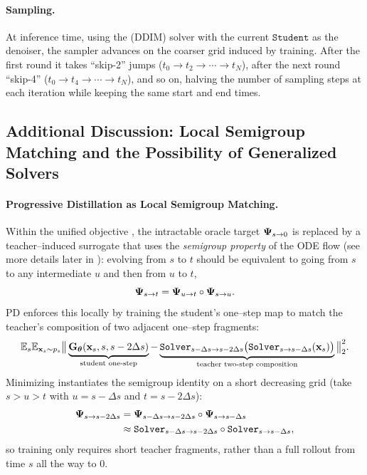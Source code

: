 \paragraph{Sampling.}
At inference time, using the (DDIM) solver with the current $\mathtt{Student}$ as the denoiser, the sampler advances on the coarser grid induced by training. After the first round it takes ``skip-2'' jumps ($t_0 \to t_2 \to \cdots \to t_N$), after the next round ``skip-4'' ($t_0 \to t_4 \to \cdots \to t_N$), and so on, halving the number of sampling steps at each iteration while keeping the same start and end times.

\subsection{Additional Discussion: Local Semigroup Matching and the Possibility of Generalized Solvers}


\paragraph{Progressive Distillation as Local Semigroup Matching.}
Within the unified objective , the intractable oracle
target ${\bm{\Psi}}_{s\to 0}$ is replaced by a teacher–induced surrogate that uses the
\emph{semigroup property} of the ODE flow (see more details later in ): evolving from $s$ to $t$ should be
equivalent to going from $s$ to any intermediate $u$ and then from $u$ to $t$,
\[
{\bm{\Psi}}_{s\to t} = {\bm{\Psi}}_{u\to t}\circ{\bm{\Psi}}_{s\to u}.
\]
PD enforces this locally by training the student’s one–step map to match the
teacher’s composition of two adjacent one–step fragments:
\begin{align}\label{eq:pd-local}
  \mathbb{E}_{s}\mathbb{E}_{{\mathbf{x}}_s\sim p_s}
  \big\|
    \underbrace{{\mathbf{G}}_{{\bm{\theta}}}({\mathbf{x}}_s, s, s-2\Delta s)}_{\text{student one-step}}
    -
    \underbrace{\mathtt{Solver}_{s-\Delta s\to s-2\Delta s}\big(\mathtt{Solver}_{s\to s-\Delta s}({\mathbf{x}}_s)\big)}_{\text{teacher two-step composition}}
  \big\|_2^2.
\end{align}
Minimizing  instantiates the semigroup identity on a short
decreasing grid (take $s>u>t$ with $u=s-\Delta s$ and $t=s-2\Delta s$):
\begin{align*}
  {\bm{\Psi}}_{s\to s-2\Delta s}
  &= {\bm{\Psi}}_{s-\Delta s\to s-2\Delta s}\circ{\bm{\Psi}}_{s\to s-\Delta s}
  \\&\approx
  \mathtt{Solver}_{s-\Delta s\to s-2\Delta s}\circ \mathtt{Solver}_{s\to s-\Delta s},
\end{align*}
so training only requires short teacher fragments, rather than a full rollout
from time $s$ all the way to $0$.


